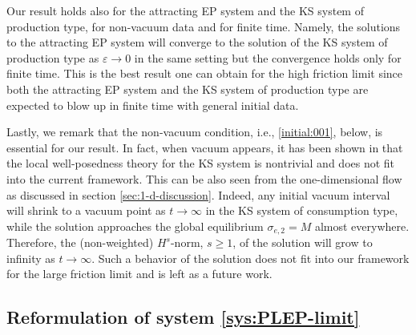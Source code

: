 \documentclass[11pt]{article}
\theoremstyle{plain}
\theoremstyle{definition}
\theoremstyle{remark}
\numberwithin{equation}{section}
\begin{document}
    Our result holds also for the attracting EP system and the KS system of production type, for non-vacuum data and for finite time. Namely, the solutions to the attracting EP system will converge to the solution of the KS system of production type as $ \varepsilon \rightarrow 0 $ in the same setting but the convergence holds only for finite time. This is the best result one can obtain for the high friction limit since both the attracting EP system and the KS system of production type are expected to blow up in finite time with general initial data. 

    Lastly, we remark that the non-vacuum condition, i.e., \eqref{initial:001}, below, is essential for our result. In fact, when vacuum appears, it has been shown in \cite{jeongWellPosednessSingularityFormation2022} that the local well-posedness theory for the KS system is nontrivial and does not fit into the current framework. This can be also seen from the one-dimensional flow as discussed in section \ref{sec:1-d-discussion}. Indeed, any initial vacuum interval will shrink to a vacuum point as $ t \rightarrow \infty $ in the KS system of consumption type,  while the solution approaches the global equilibrium $ \sigma_{e,2} = M $ almost everywhere. Therefore, the (non-weighted) $H^s$-norm, $s\geq 1$, of the solution will grow to infinity as $ t \rightarrow \infty $. Such a behavior of the solution does not fit into our framework for the large friction limit and is left as a future work.


\subsection{Reformulation of system \eqref{sys:PLEP-limit}}
\label{sec:reformulation}
\end{document}
